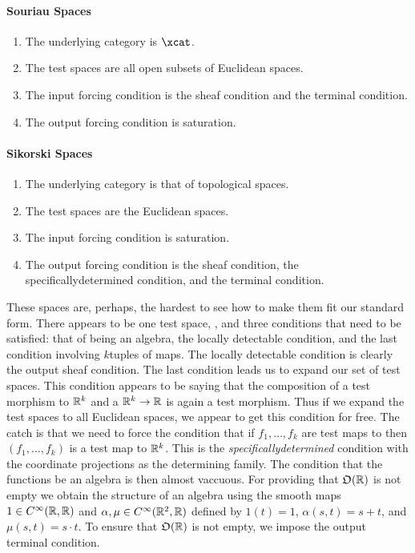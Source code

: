 \documentclass[%
a4paper,%
arxiv,%
defaults
]{myclass}
\begin{document}
\paragraph{Souriau Spaces}

\begin{enumerate}
\item The underlying category is \(\xcat\).
\item The test spaces are all open subsets of Euclidean spaces.
\item The input forcing condition is the sheaf condition and the terminal condition.
\item The output forcing condition is saturation.
\end{enumerate}

\paragraph{Sikorski Spaces}

\begin{enumerate}
\item The underlying category is that of topological spaces.
\item The test spaces are the Euclidean spaces.
\item The input forcing condition is saturation.
\item The output forcing condition is the sheaf condition, the specifically\enhyp{}determined condition, and the terminal condition.
\end{enumerate}

These spaces are, perhaps, the hardest to see how to make them fit our standard form.
There appears to be one test space, \R, and three conditions that need to be satisfied: that of being an algebra, the locally detectable condition, and the last condition involving \(k\)\enhyp{}tuples of maps.
The locally detectable condition is clearly the output sheaf condition.
The last condition leads us to expand our set of test spaces.
This condition appears to be saying that the composition of a test morphism to \(\mathbb{R}^k\) and a \cimap \(\mathbb{R}^k \to \mathbb{R}\) is again a test morphism.
Thus if we expand the test spaces to all Euclidean spaces, we appear to get this condition for free.
The catch is that we need to force the condition that if \(f_1, \dotsc, f_k\) are test maps to \R then \((f_1, \dotsc, f_k)\) is a test map to \(\mathbb{R}^k\).
This is the \emph{specifically\enhyp{}determined} condition with the coordinate projections as the determining family.
The condition that the functions be an algebra is then almost vaccuous.
For providing that \(\otest(\R)\) is not empty we obtain the structure of an algebra using the smooth maps \(1 \in C^\infty(\mathbb{R},\mathbb{R})\) and \(\alpha, \mu \in C^\infty(\mathbb{R}^2, \mathbb{R})\) defined by \(1(t) = 1\), \(\alpha(s,t) = s + t\), and \(\mu(s,t) = s \cdot t\).
To ensure that \(\otest(\R)\) is not empty, we impose the output terminal condition.
\end{document}
